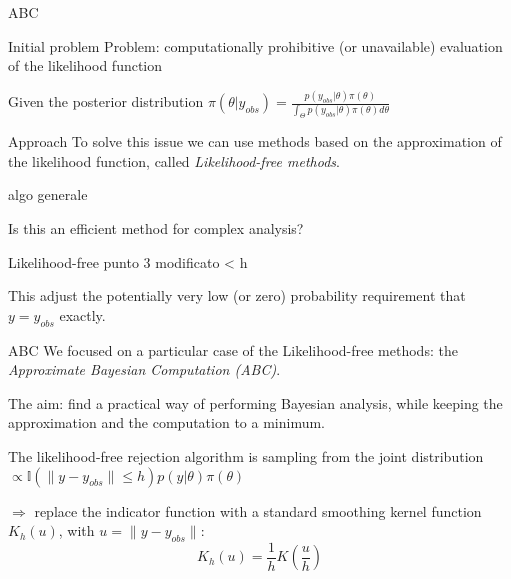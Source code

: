 \documentclass{beamer}
\theoremstyle{plain}
\begin{document}
\begin{section}{ABC}
\begin{frame}{Initial problem}
	Problem: computationally prohibitive (or unavailable) evaluation of the likelihood function
	
	\vspace{1cm}
	Given the posterior distribution $\pi(\theta | y_{obs}) = \frac{p(y_{obs}|\theta) \pi(\theta)}{\int _{\Theta }p(y_{obs}|\theta) \pi(\theta) d\theta }$ 
\end{frame}

\begin{frame}{Approach}
	To solve this issue we can use methods based on the approximation of the likelihood function, called \textit{Likelihood-free methods}.
	\vspace{0.5cm}
	
	algo generale
	
	\vspace{0.5cm}
	Is this an efficient method for complex analysis?

\end{frame}

\begin{frame}{Likelihood-free}
	punto 3 modificato  < h
	
	\vspace{0.5cm}
	
	This adjust the potentially very low (or zero) probability requirement that $y = y_{obs}$ exactly.
\end{frame}

\begin{frame}{ABC}
	We focused on a particular case of the Likelihood-free methods: the \emph{Approximate Bayesian Computation (ABC)}.
	
	\vspace{0.5cm}
	
	The aim: find a practical way of performing Bayesian analysis, while keeping the approximation and the computation to a minimum.
	
	\vspace{0.5cm}
	The likelihood-free rejection algorithm is sampling from the joint distribution $\propto \mathbb{I}(\parallel y-y_{obs} \parallel \leq h)p(y|\theta)\pi(\theta)$
	
	
	$\Longrightarrow$ replace the indicator function with a standard smoothing kernel function $K_h(u)$, with $u=\parallel y-y_{obs} \parallel$:
	\[ K_h(u)  =  \frac{1}{h}  K  ( \frac{u}{h} )  \]
	

\end{frame}
\end{section}
\end{document}
